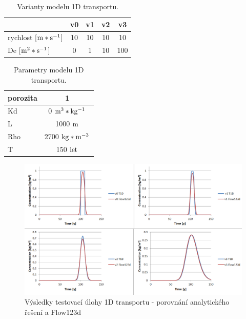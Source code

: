\documentclass[11pt,a4paper]{article}
\begin{document}
\begin{onehalfspacing}
\begin{table}[ht]
\begin{center}
    \caption{Varianty modelu 1D transportu.}
    \begin{tabular}{ | l | c | c | c | c |}
    \hline
    \small  & \small v0 & \small v1 & \small v2 & \small v3\\ \hline
    \small rychlost [$\rm m*s^{-1}$] & \small 10 & \small 10 & \small 10 & \small 10\\ \hline
    \small De [$\rm m^{2}*s^{-1}$] & \small 0 & \small 1 & \small 10 & \small 100\\ \hline
    \end{tabular}
    \label{varianty}
\end{center}
\end{table}

\begin{table}[ht]
\begin{center}
    \caption{Parametry modelu 1D transportu.}
    \begin{tabular}{ | l | c |}
    \hline
    \small porozita & \small 1\\ \hline
    \small Kd & \small 0 $\rm m^{3}*kg^{-1}$\\ \hline
    \small L & \small 1000 $\rm m$\\ \hline
    \small Rho & \small 2700 $\rm kg*m^{-3}$\\ \hline
    \small T & \small 150 $\rm let$\\ \hline
    \end{tabular}
    \label{parametry}
\end{center}
\end{table}

\begin{figure}[h]
\centering
\includegraphics[width=\textwidth]{graphics/v0_3.png}
\caption{Výsledky testovací úlohy 1D transportu - porovnání analytického řešení a Flow123d}
\label{results}
\end{figure}



\end{onehalfspacing}
\end{document}
